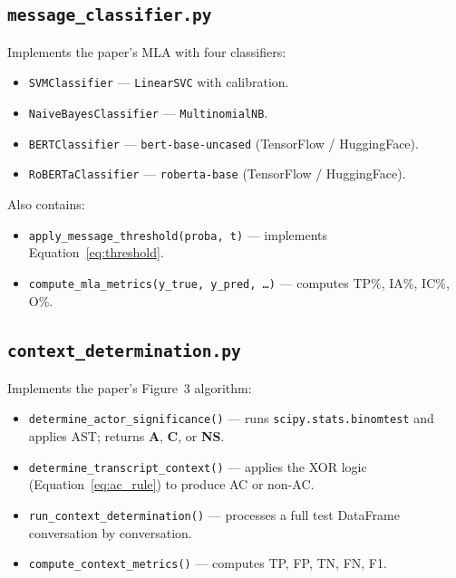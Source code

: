 \documentclass[12pt,a4paper]{article}
\begin{document}
\subsection{\texttt{message\_classifier.py}}

Implements the paper's MLA with four classifiers:

\begin{itemize}[leftmargin=*]
  \item \texttt{SVMClassifier} --- \texttt{LinearSVC} with calibration.
  \item \texttt{NaiveBayesClassifier} --- \texttt{MultinomialNB}.
  \item \texttt{BERTClassifier} --- \texttt{bert-base-uncased}
        (TensorFlow / HuggingFace).
  \item \texttt{RoBERTaClassifier} --- \texttt{roberta-base}
        (TensorFlow / HuggingFace).
\end{itemize}

Also contains:
\begin{itemize}[leftmargin=*]
  \item \texttt{apply\_message\_threshold(proba,~t)} --- implements
        Equation~\ref{eq:threshold}.
  \item \texttt{compute\_mla\_metrics(y\_true, y\_pred, \ldots)} ---
        computes TP\%, IA\%, IC\%, O\%.
\end{itemize}

\subsection{\texttt{context\_determination.py}}

Implements the paper's Figure~3 algorithm:

\begin{itemize}[leftmargin=*]
  \item \texttt{determine\_actor\_significance()} --- runs
        \texttt{scipy.stats.binomtest} and applies AST; returns
        \textbf{A}, \textbf{C}, or \textbf{NS}.
  \item \texttt{determine\_transcript\_context()} --- applies the XOR
        logic (Equation~\ref{eq:ac_rule}) to produce AC or non-AC.
  \item \texttt{run\_context\_determination()} --- processes a full test
        DataFrame conversation by conversation.
  \item \texttt{compute\_context\_metrics()} --- computes TP, FP, TN,
        FN, F1.
\end{itemize}
\end{document}

